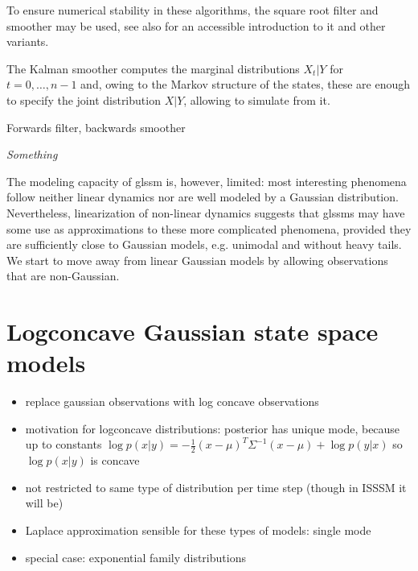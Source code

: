 To ensure numerical stability in these algorithms, the square root filter and smoother \cite{Morf1975Squareroot} may be used, see also \cite{Schneider1986Kalmanfilter} for an accessible introduction to it and other variants.

The Kalman smoother computes the marginal distributions $X_{t} | Y$ for $t = 0, \dots, n-1$ and, owing to the Markov structure of the states, these are enough to specify the joint distribution $X|Y$, allowing to simulate from it.

\begin{algorithm}
    \caption{Forwards filter, backwards smoother \cite[Proposition 1]{Fruhwirth-Schnatter1994Data}}
    \emph{Something}\;
\end{algorithm}

The modeling capacity of \gls{glssm} is, however, limited: most interesting phenomena follow neither linear dynamics nor are well modeled by a Gaussian distribution.
Nevertheless, linearization of non-linear dynamics suggests that  \gls{glssm}s may have some use as approximations to these more complicated phenomena, provided they are sufficiently close to Gaussian models, e.g. unimodal and without heavy tails.
We start to move away from linear Gaussian models by allowing observations that are non-Gaussian.

\section{Logconcave Gaussian state space models}
\label{sec:logconcave_gaussian_state_space_models}

\begin{itemize}
    \item replace gaussian observations with log concave observations
    \item motivation for logconcave distributions: posterior has unique mode, because up to constants $\log p(x | y) = - \frac{1}{2} (x - \mu)^T \Sigma^{-1} (x - \mu) + \log p(y | x) $ so $\log p(x|y)$ is concave
    \item not restricted to same type of distribution per time step (though in ISSSM it will be)
    \item Laplace approximation sensible for these types of models: single mode
    \item special case: exponential family distributions
\end{itemize}

